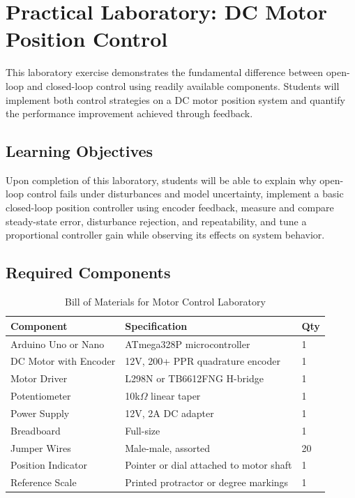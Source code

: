 \section{Practical Laboratory: DC Motor Position Control}
\label{sec:lab}

This laboratory exercise demonstrates the fundamental difference between open-loop and closed-loop control using readily available components. Students will implement both control strategies on a DC motor position system and quantify the performance improvement achieved through feedback.

\subsection{Learning Objectives}

Upon completion of this laboratory, students will be able to explain why open-loop control fails under disturbances and model uncertainty, implement a basic closed-loop position controller using encoder feedback, measure and compare steady-state error, disturbance rejection, and repeatability, and tune a proportional controller gain while observing its effects on system behavior.

\subsection{Required Components}

\begin{table}[htbp]
\centering
\caption{Bill of Materials for Motor Control Laboratory}
\label{tab:bom}
\begin{tabular}{lll}
\toprule
\textbf{Component} & \textbf{Specification} & \textbf{Qty} \\
\midrule
Arduino Uno or Nano & ATmega328P microcontroller & 1 \\
DC Motor with Encoder & 12V, 200+ PPR quadrature encoder & 1 \\
Motor Driver & L298N or TB6612FNG H-bridge & 1 \\
Potentiometer & 10k$\Omega$ linear taper & 1 \\
Power Supply & 12V, 2A DC adapter & 1 \\
Breadboard & Full-size & 1 \\
Jumper Wires & Male-male, assorted & 20 \\
Position Indicator & Pointer or dial attached to motor shaft & 1 \\
Reference Scale & Printed protractor or degree markings & 1 \\
\bottomrule
\end{tabular}
\end{table}

